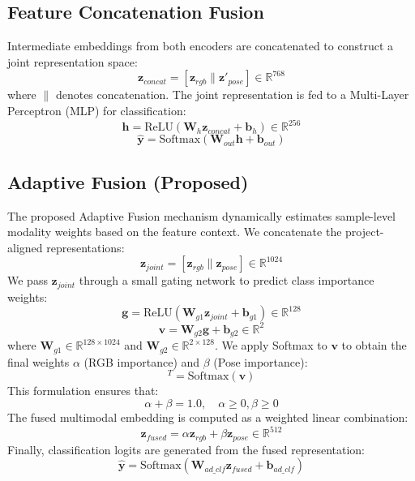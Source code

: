 \documentclass[conference]{IEEEtran}
\begin{document}
\subsection{Feature Concatenation Fusion}
Intermediate embeddings from both encoders are concatenated to construct a joint representation space:
\begin{equation}
    \mathbf{z}_{concat} = [\mathbf{z}_{rgb} \parallel \mathbf{z}'_{pose}] \in \mathbb{R}^{768}
\end{equation}
where $\parallel$ denotes concatenation. The joint representation is fed to a Multi-Layer Perceptron (MLP) for classification:
\begin{equation}
    \mathbf{h} = \text{ReLU}(\mathbf{W}_{h} \mathbf{z}_{concat} + \mathbf{b}_{h}) \in \mathbb{R}^{256}
\end{equation}
\begin{equation}
    \hat{\mathbf{y}} = \text{Softmax}(\mathbf{W}_{out} \mathbf{h} + \mathbf{b}_{out})
\end{equation}

\subsection{Adaptive Fusion (Proposed)}
The proposed Adaptive Fusion mechanism dynamically estimates sample-level modality weights based on the feature context. We concatenate the project-aligned representations:
\begin{equation}
    \mathbf{z}_{joint} = [\mathbf{z}_{rgb} \parallel \mathbf{z}_{pose}] \in \mathbb{R}^{1024}
\end{equation}
We pass $\mathbf{z}_{joint}$ through a small gating network to predict class importance weights:
\begin{equation}
    \mathbf{g} = \text{ReLU}(\mathbf{W}_{g1} \mathbf{z}_{joint} + \mathbf{b}_{g1}) \in \mathbb{R}^{128}
\end{equation}
\begin{equation}
    \mathbf{v} = \mathbf{W}_{g2} \mathbf{g} + \mathbf{b}_{g2} \in \mathbb{R}^2
\end{equation}
where $\mathbf{W}_{g1} \in \mathbb{R}^{128 \times 1024}$ and $\mathbf{W}_{g2} \in \mathbb{R}^{2 \times 128}$. We apply Softmax to $\mathbf{v}$ to obtain the final weights $\alpha$ (RGB importance) and $\beta$ (Pose importance):
\begin{equation}
    [\alpha, \beta]^T = \text{Softmax}(\mathbf{v})
\end{equation}
This formulation ensures that:
\begin{equation}
    \alpha + \beta = 1.0, \quad \alpha \geq 0, \beta \geq 0
\end{equation}
The fused multimodal embedding is computed as a weighted linear combination:
\begin{equation}
    \mathbf{z}_{fused} = \alpha \mathbf{z}_{rgb} + \beta \mathbf{z}_{pose} \in \mathbb{R}^{512}
\end{equation}
Finally, classification logits are generated from the fused representation:
\begin{equation}
    \hat{\mathbf{y}} = \text{Softmax}(\mathbf{W}_{ad\_clf} \mathbf{z}_{fused} + \mathbf{b}_{ad\_clf})
\end{equation}
\end{document}
